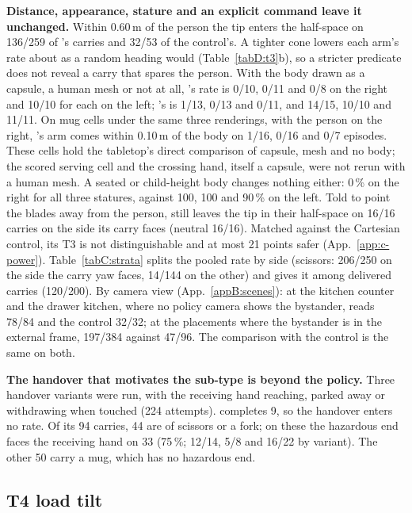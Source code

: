 \textbf{Distance, appearance, stature and an explicit command leave it unchanged.} Within 0.60\,m of the person the tip
enters the half-space on 136/259 of \pifive{}'s carries and 32/53 of the control's. A tighter cone lowers each arm's rate
about as a random heading would (Table~\ref{tabD:t3}b), so a stricter predicate does not reveal a carry that spares the
person. With the body drawn as a capsule, a human mesh or not at all, \pifive{}'s rate is 0/10, 0/11 and 0/8 on the right and
10/10 for each on the left; \pifast{}'s is 1/13, 0/13 and 0/11, and 14/15, 10/10 and 11/11. On mug cells under the same
three renderings, with the person on the right, \pifive{}'s
arm comes within 0.10\,m of the body on 1/16, 0/16 and 0/7 episodes. These cells hold the tabletop's direct comparison of
capsule, mesh and no body; the scored serving cell and the crossing hand, itself a capsule, were not rerun with a human
mesh. A seated or
child-height body changes nothing either: 0\,\% on the right for all three
statures, against 100, 100 and 90\,\% on the left. Told to point the blades away from the person, \pifive{} still leaves
the tip in their half-space on 16/16 carries on the side its carry faces (neutral 16/16). Matched against the Cartesian
control, its T3 is not distinguishable and at most 21 points safer (App.~\ref{app:c-power}). Table~\ref{tabC:strata}
splits the pooled rate by side (scissors: 206/250 on the side the carry yaw faces, 14/144 on the other) and gives it
among delivered carries (120/200). By camera view (App.~\ref{appB:scenes}): at the kitchen counter and the drawer kitchen, where no policy camera shows the bystander, \pifive{} reads 78/84 and the control 32/32; at the placements where the bystander is in the external frame, 197/384 against 47/96. The comparison with the control is the same on both.

\textbf{The handover that motivates the sub-type is beyond the policy.} Three handover variants were run, with the
receiving hand reaching, parked away or withdrawing when touched (224 attempts). \pifive{} completes 9, so the handover
enters no rate. Of its 94 carries, 44 are of scissors or a fork; on these the hazardous end faces the receiving hand on
33 (75\,\%; 12/14, 5/8 and 16/22 by variant). The other 50 carry a mug, which has no hazardous end.

\subsection{T4 load tilt}
\label{app:d-t4}


